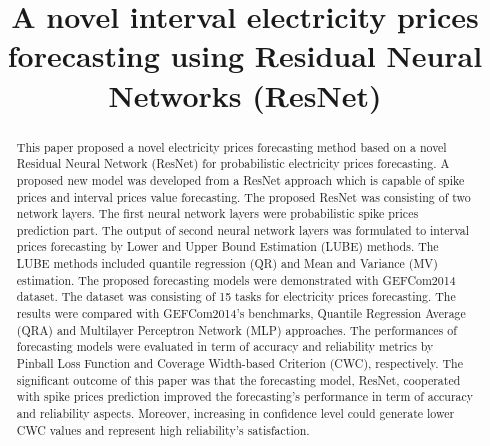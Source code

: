 \documentclass[review]{elsarticle}
\begin{document}
  \begin{frontmatter}

    \title{A novel interval electricity prices forecasting using Residual Neural Networks (ResNet)}



    \begin{abstract}
      This paper proposed a novel electricity prices forecasting method based on a novel Residual Neural Network (ResNet) for probabilistic electricity prices forecasting.
      A proposed new model was developed from a ResNet approach which is capable of spike prices and interval prices value forecasting.
      The proposed ResNet was consisting of two network layers.
      The first neural network layers were probabilistic spike prices prediction part.
      The output of second neural network layers was formulated to interval prices forecasting by Lower and Upper Bound Estimation (LUBE) methods.
      The LUBE methods included quantile regression (QR) and Mean and Variance (MV) estimation.
      The proposed forecasting models were demonstrated with GEFCom2014 dataset.
      The dataset was consisting of 15 tasks for electricity prices forecasting.
      The results were compared with GEFCom2014's benchmarks, Quantile Regression Average (QRA) and Multilayer Perceptron Network (MLP) approaches.
      The performances of forecasting models were evaluated in term of accuracy and reliability metrics by Pinball Loss Function and Coverage Width-based Criterion (CWC), respectively.
      The significant outcome of this paper was that the forecasting model, ResNet, cooperated with spike prices prediction improved the forecasting's performance in term of accuracy and reliability aspects.
      Moreover, increasing in confidence level could generate lower CWC values and represent high reliability's satisfaction.
    \end{abstract}


\end{frontmatter}
\end{document}
